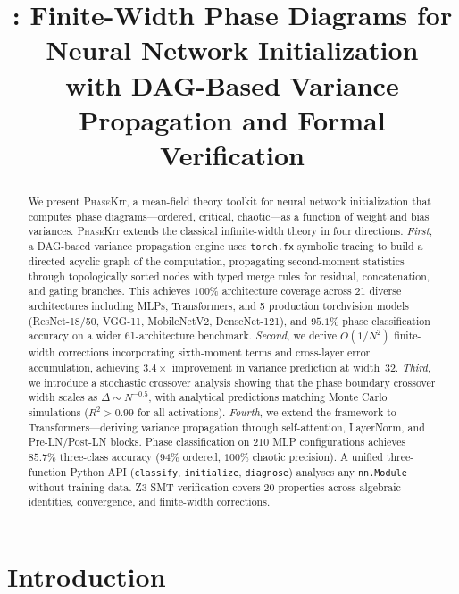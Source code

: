 \documentclass[10pt]{article}
\title{\ToolName{}: Finite-Width Phase Diagrams for Neural Network Initialization\\with DAG-Based Variance Propagation and Formal Verification}
\author{}
\date{}
\newcommand{\ToolName}{\textsc{PhaseKit}}
\begin{document}
\maketitle

\begin{abstract}
We present \ToolName{}, a mean-field theory toolkit for neural network initialization that computes phase diagrams---ordered, critical, chaotic---as a function of weight and bias variances.
\ToolName{} extends the classical infinite-width theory in four directions.
\emph{First}, a DAG-based variance propagation engine uses \texttt{torch.fx} symbolic tracing to build a directed acyclic graph of the computation, propagating second-moment statistics through topologically sorted nodes with typed merge rules for residual, concatenation, and gating branches.
This achieves $100\%$ architecture coverage across 21 diverse architectures including MLPs, Transformers, and 5 production torchvision models (ResNet-18/50, VGG-11, MobileNetV2, DenseNet-121), and $95.1\%$ phase classification accuracy on a wider 61-architecture benchmark.
\emph{Second}, we derive $O(1/N^2)$ finite-width corrections incorporating sixth-moment terms and cross-layer error accumulation, achieving $3.4\times$ improvement in variance prediction at width~32.
\emph{Third}, we introduce a stochastic crossover analysis showing that the phase boundary crossover width scales as $\Delta \sim N^{-0.5}$, with analytical predictions matching Monte Carlo simulations ($R^2 > 0.99$ for all activations).
\emph{Fourth}, we extend the framework to Transformers---deriving variance propagation through self-attention, LayerNorm, and Pre-LN/Post-LN blocks.
Phase classification on 210 MLP configurations achieves $85.7\%$ three-class accuracy ($94\%$ ordered, $100\%$ chaotic precision).
A unified three-function Python API (\texttt{classify}, \texttt{initialize}, \texttt{diagnose}) analyses any \texttt{nn.Module} without training data.
Z3 SMT verification covers 20 properties across algebraic identities, convergence, and finite-width corrections.
\end{abstract}

\section{Introduction}
\label{sec:intro}
\end{document}
